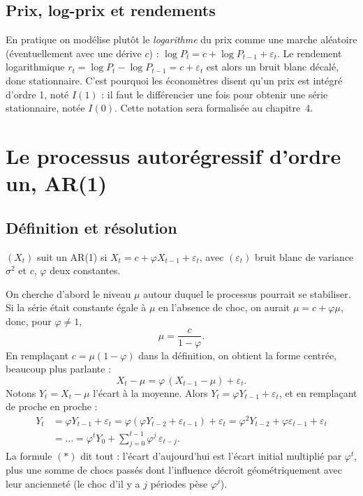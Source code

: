 \subsection{Prix, log-prix et rendements}
En pratique on modélise plutôt le \emph{logarithme} du prix comme une marche aléatoire (éventuellement avec une dérive $c$) : $\log P_t = c + \log P_{t-1} + \varepsilon_t$. Le rendement logarithmique $r_t = \log P_t - \log P_{t-1} = c + \varepsilon_t$ est alors un bruit blanc décalé, donc stationnaire. C'est pourquoi les économètres disent qu'un prix est \og intégré d'ordre 1\fg, noté $I(1)$ : il faut le différencier une fois pour obtenir une série stationnaire, notée $I(0)$. Cette notation sera formalisée au chapitre~4.

\section{Le processus autorégressif d'ordre un, AR(1)}

\subsection{Définition et résolution}

\begin{definition}
$(X_t)$ suit un AR(1) si $X_t = c + \varphi X_{t-1} + \varepsilon_t$, avec $(\varepsilon_t)$ bruit blanc de variance $\sigma^2$ et $c$, $\varphi$ deux constantes.
\end{definition}

On cherche d'abord le niveau $\mu$ autour duquel le processus pourrait se stabiliser. Si la série était constante égale à $\mu$ en l'absence de choc, on aurait $\mu = c + \varphi\mu$, donc, pour $\varphi \ne 1$,
\[
\mu = \frac{c}{1-\varphi}.
\]
En remplaçant $c = \mu(1-\varphi)$ dans la définition, on obtient la forme \og centrée\fg{}, beaucoup plus parlante :
\begin{equation}\label{c1:eq:ar1c}
X_t - \mu = \varphi\,(X_{t-1}-\mu) + \varepsilon_t.
\end{equation}
Notons $Y_t = X_t - \mu$ l'écart à la moyenne. Alors $Y_t = \varphi Y_{t-1} + \varepsilon_t$, et en remplaçant de proche en proche :
\begin{align*}
Y_t &= \varphi Y_{t-1} + \varepsilon_t = \varphi(\varphi Y_{t-2} + \varepsilon_{t-1}) + \varepsilon_t = \varphi^2 Y_{t-2} + \varphi\varepsilon_{t-1} + \varepsilon_t\\
&= \dots = \varphi^t Y_0 + \sum_{j=0}^{t-1}\varphi^j\,\varepsilon_{t-j}. \tag{$\ast$}
\end{align*}
La formule $(\ast)$ dit tout : l'écart d'aujourd'hui est l'écart initial multiplié par $\varphi^t$, plus une somme de chocs passés dont l'influence décroît géométriquement avec leur ancienneté (le choc d'il y a $j$ périodes pèse $\varphi^j$).

